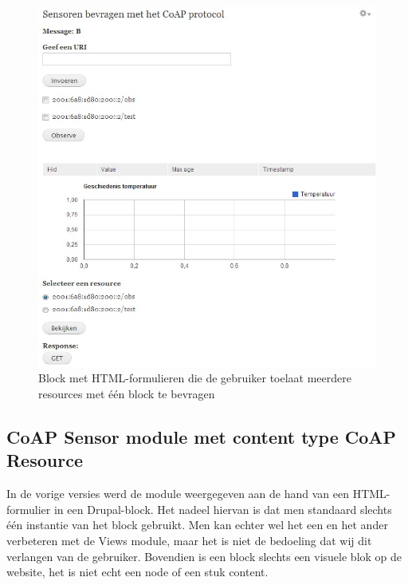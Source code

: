 \begin{figure}[h!]
\centering
\includegraphics[width=1\textwidth]{fig/meerdere_resources}
\caption{Block met HTML-formulieren die de gebruiker toelaat meerdere resources met \'{e}\'{e}n block te bevragen}
\label{fig:meerdereResources}
\end{figure}

\subsection{CoAP Sensor module met content type CoAP Resource}
In de vorige versies werd de module weergegeven aan de hand van een HTML-formulier in een Drupal-block. Het nadeel hiervan is dat men standaard slechts \'{e}\'{e}n instantie van het block gebruikt. Men kan echter wel het een en het ander verbeteren met de Views module, maar het is niet de bedoeling dat wij dit verlangen van de gebruiker. Bovendien is een block slechts een visuele blok op de website, het is niet echt een node of een stuk content.\\

